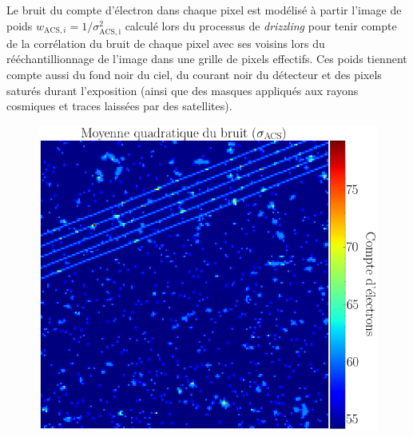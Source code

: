\documentclass[times,10pt,twocolumn]{article}
\begin{document}
Le bruit du compte d'électron dans chaque pixel
est modélisé à partir 
l'image de poids $w_{\mathrm{ACS}, i} = 1/\sigma^2_{\mathrm{ACS, i}}$ 
calculé lors du processus de 
\textit{drizzling} pour tenir compte de la corrélation du bruit de chaque pixel 
avec ses voisins lors du rééchantillionnage de l'image dans une grille de pixels 
effectifs.
Ces poids tiennent compte aussi
du fond noir du ciel, du courant noir du détecteur et des pixels saturés 
durant l'exposition (ainsi que des masques appliqués aux rayons cosmiques 
et traces laissées par des satellites).
\begin{figure}[H]
        \centering
        \includegraphics[width=\linewidth]{noise_map}
        \caption{}
        \label{fig:}
\end{figure}
\end{document}

